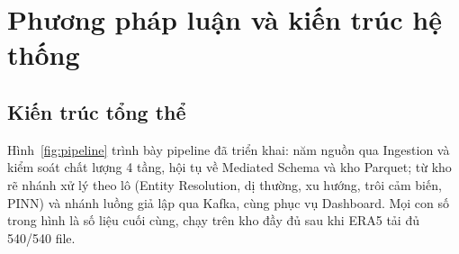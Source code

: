 \documentclass[12pt,a4paper]{report}
\begin{document}
\chapter{Phương pháp luận và kiến trúc hệ thống}

\section{Kiến trúc tổng thể}

Hình~\ref{fig:pipeline} trình bày pipeline đã triển khai: năm nguồn qua Ingestion và kiểm soát chất
lượng 4 tầng, hội tụ về Mediated Schema và kho Parquet; từ kho rẽ nhánh xử lý theo lô (Entity Resolution,
dị thường, xu hướng, trôi cảm biến, PINN) và nhánh luồng giả lập qua Kafka, cùng phục vụ Dashboard. Mọi
con số trong hình là số liệu cuối cùng, chạy trên kho đầy đủ sau khi ERA5 tải đủ 540/540 file.
\end{document}
